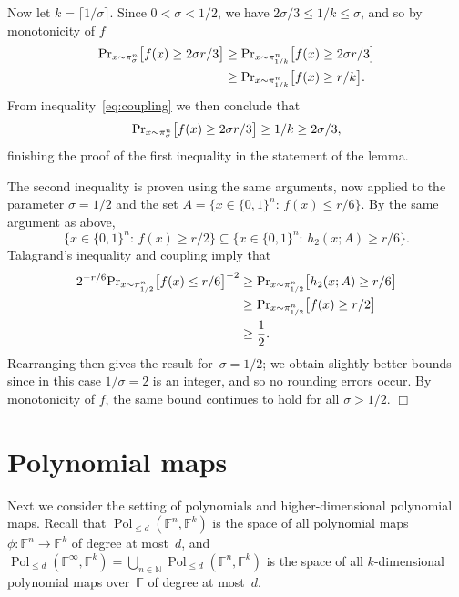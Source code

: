 \documentclass[10pt]{article}
\renewenvironment{proof}[1][]{
    	\begin{trivlist}
     	\item[\hspace{\labelsep}{\em\noindent Proof#1:\/}]}
     	{{\hfill$\Box$}
    	\end{trivlist}
  }
\renewcommand{\Pr}{\mbox{\rm Pr}}
\newcommand{\N}{\mathbb{N}}
\newcommand{\F}{\mathbb{F}}
\newcommand{\bset}[1]{\{0,1\}^{#1}}
\newcommand{\1}{\mathbf{1}}
\newcommand{\st}{:\,}
\DeclareMathOperator{\Pol}{Pol}
\newcommand{\beqn}{\begin{equation*}}
\newcommand{\eeqn}{\end{equation*}}
\begin{document}
\begin{proof}
Now let $k = \lceil 1/\sigma \rceil$.
Since $0 < \sigma < 1/2$, we have $2\sigma/3 \leq 1/k \leq \sigma$, and so by monotonicity of $f$
\begin{align*}
    \Pr_{x\sim \pi_{\sigma}^n}\big[ f(x)\geq 2\sigma r/3\big] &\geq \Pr_{x\sim \pi_{1/k}^n}\big[ f(x)\geq 2\sigma r/3\big] \\
    &\geq \Pr_{x\sim \pi_{1/k}^n}\big[ f(x)\geq r/k\big].
\end{align*}
From inequality~\eqref{eq:coupling} we then conclude that
\beqn
\Pr_{x\sim \pi_{\sigma}^n}\big[ f(x)\geq 2\sigma r/3\big] \geq 1/k \geq 2\sigma/3,
\eeqn
finishing the proof of the first inequality in the statement of the lemma.

The second inequality is proven using the same arguments, now applied to the parameter $\sigma = 1/2$ and the set $A = \big\{ x\in \bset{n} \st f(x)\leq r/6 \big\}$.
By the same argument as above,
\begin{equation*}
    \big\{x\in \bset{n}\st f(x) \geq r/2\big\} \subseteq \big\{x\in \bset{n}\st h_2(x;A) \geq r/6\big\}.
\end{equation*}
Talagrand's inequality and coupling imply that
\begin{align*}
    2^{-r/6}\Pr_{x\sim\pi_{1/2}^n}\big[f(x) \leq r/6\big]^{-2} &\geq \Pr_{x\sim \pi_{1/2}^n}\big[h_2(x;A) \geq r/6\big]\\
    &\geq \Pr_{x\sim\pi_{1/2}^n}\big[f(x) \geq r/2\big]\\
    &\geq \frac{1}{2}.
\end{align*}
Rearranging then gives the result for~$\sigma =  1/2$;
we obtain slightly better bounds since in this case $1/\sigma = 2$ is an integer, and so no rounding errors occur.
By monotonicity of $f$, the same bound continues to hold for all $\sigma > 1/2$.
\end{proof}
\setcounter{section}{2}
\section{Polynomial maps}
\label{sec:polynomials}

Next we consider the setting of polynomials and higher-dimensional polynomial maps.
Recall that $\Pol_{\leq d}(\F^n, \F^k)$ is the space of all polynomial maps~$\phi: \F^n \to \F^k$ of degree at most~$d$, and $\Pol_{\leq d}(\F^{\infty}, \F^k) = \bigcup_{n\in \N} \Pol_{\leq d}(\F^n, \F^k)$ is the space of all $k$-dimensional polynomial maps over~$\F$ of degree at most~$d$.
\end{document}
